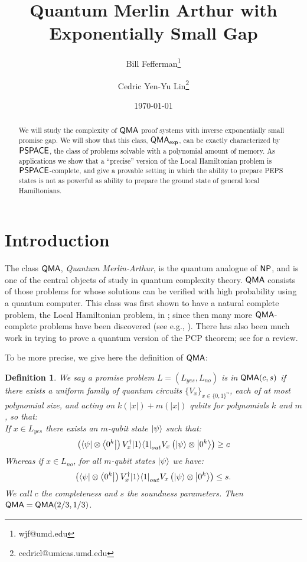 \documentclass[11pt]{article}
\newtheorem{definition}{Definition}
\theoremstyle{definition}
\theoremstyle{remark}
\newcommand\QMA{{\sf{QMA}}}
\newcommand\PSPACE{{\sf{PSPACE}}}
\newcommand\NP{{\sf{NP}}}
\newcommand\QMAexp{{\sf{QMA}_{exp}}}
\begin{document}
\title{Quantum Merlin Arthur with Exponentially Small Gap}
\author[1]{Bill Fefferman\thanks{wjf@umd.edu}}
\author[1]{Cedric Yen-Yu Lin\thanks{cedricl@umicas.umd.edu}}
\date{\today}

\maketitle

\begin{abstract}
We will study the complexity of $\QMA$ proof systems with inverse exponentially small promise gap.  We will show that this class, $\QMAexp$, can be exactly characterized by $\PSPACE$, the class of problems solvable with a polynomial amount of memory.  As applications we show that a ``precise'' version of the Local Hamiltonian problem is $\PSPACE$-complete, and give a provable setting in which the ability to prepare PEPS states is not as powerful as ability to prepare the ground state of general local Hamiltonians.
\end{abstract}

\section{Introduction}
The class $\QMA$, \emph{Quantum Merlin-Arthur}, is the quantum analogue of $\NP$, and is one of the central objects of study in quantum complexity theory. $\QMA$ consists of those problems for whose solutions can be verified with high probability using a quantum computer. This class was first shown to have a natural complete problem, the Local Hamiltonian problem, in \cite{ksv02}; since then many more  $\QMA$-complete problems have been discovered (see e.g., \cite{bookatz14}). There has also been much work in trying to prove a quantum version of the PCP theorem; see \cite{qpcpsurvey} for a review.

To be more precise, we give here the definition of $\QMA$:
\begin{definition}We say a promise problem $L=(L_{yes},L_{no})$ is in $\QMA(c,s)$ if there exists a uniform family of quantum circuits $\{ V_x\}_{x\in\{0,1\}^n}$, each of at most polynomial size, and acting on $k(|x|)+m(|x|)$ qubits for polynomials $k$ and $m$, so that:\\

If $x \in L_{yes}$ there exists an $m$-qubit state ${\left\vert{\psi}\right\rangle}$ such that:
\begin{equation}
\left({\left\langle{\psi}\right\vert}\otimes {\left\langle{0^k}\right\vert}\right) V^\dagger_x {\left\vert{1}\right\rangle}{\left\langle{1}\right\vert}_{out} V_x \left({\left\vert{\psi}\right\rangle}\otimes {\left\vert{0^k}\right\rangle}\right) \ge c
\end{equation}
Whereas if $x \in L_{no}$, for all $m$-qubit states ${\left\vert{\psi}\right\rangle}$ we have:
\begin{equation}
\left({\left\langle{\psi}\right\vert}\otimes {\left\langle{0^k}\right\vert}\right) V^\dagger_x {\left\vert{1}\right\rangle}{\left\langle{1}\right\vert}_{out} V_x \left({\left\vert{\psi}\right\rangle}\otimes {\left\vert{0^k}\right\rangle}\right) \le s.
\end{equation}
We call $c$ the completeness and $s$ the soundness parameters. Then $\QMA = \QMA(2/3,1/3)$.
  \end{definition}
  
\end{document}
